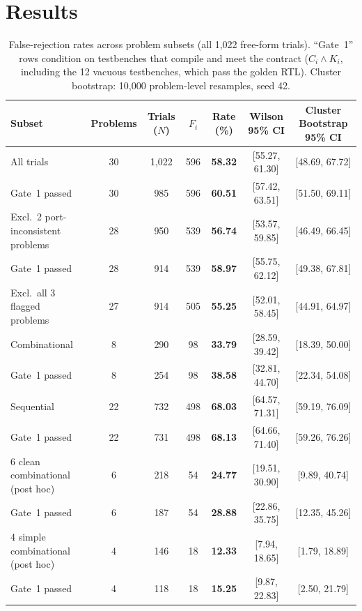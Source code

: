 \documentclass[conference]{IEEEtran}
\begin{document}
\section{Results}

\begin{table}[t]
\centering
\caption{False-rejection rates across problem subsets (all 1,022 free-form trials). ``Gate~1'' rows condition on testbenches that compile and meet the contract ($C_i \land K_i$, including the 12 vacuous testbenches, which pass the golden RTL). Cluster bootstrap: 10,000 problem-level resamples, seed 42.}
\label{tab:headline_rates}
\footnotesize
\setlength{\tabcolsep}{4pt}
\begin{tabular}{lcccccc}
\toprule
\textbf{Subset} & \textbf{Problems} & \textbf{Trials ($N$)} & \textbf{$F_i$} & \textbf{Rate (\%)} & \textbf{Wilson 95\% CI} & \textbf{Cluster Bootstrap 95\% CI} \\
\midrule
All trials & 30 & 1,022 & 596 & \textbf{58.32} & [55.27, 61.30] & [48.69, 67.72] \\
Gate~1 passed & 30 & 985 & 596 & \textbf{60.51} & [57.42, 63.51] & [51.50, 69.11] \\
\midrule
Excl.\ 2 port-inconsistent problems & 28 & 950 & 539 & \textbf{56.74} & [53.57, 59.85] & [46.49, 66.45] \\
\quad Gate~1 passed & 28 & 914 & 539 & \textbf{58.97} & [55.75, 62.12] & [49.38, 67.81] \\
Excl.\ all 3 flagged problems & 27 & 914 & 505 & \textbf{55.25} & [52.01, 58.45] & [44.91, 64.97] \\
\midrule
Combinational & 8 & 290 & 98 & \textbf{33.79} & [28.59, 39.42] & [18.39, 50.00] \\
\quad Gate~1 passed & 8 & 254 & 98 & \textbf{38.58} & [32.81, 44.70] & [22.34, 54.08] \\
Sequential & 22 & 732 & 498 & \textbf{68.03} & [64.57, 71.31] & [59.19, 76.09] \\
\quad Gate~1 passed & 22 & 731 & 498 & \textbf{68.13} & [64.66, 71.40] & [59.26, 76.26] \\
\midrule
6 clean combinational (post hoc) & 6 & 218 & 54 & \textbf{24.77} & [19.51, 30.90] & [9.89, 40.74] \\
\quad Gate~1 passed & 6 & 187 & 54 & \textbf{28.88} & [22.86, 35.75] & [12.35, 45.26] \\
4 simple combinational (post hoc) & 4 & 146 & 18 & \textbf{12.33} & [7.94, 18.65] & [1.79, 18.89] \\
\quad Gate~1 passed & 4 & 118 & 18 & \textbf{15.25} & [9.87, 22.83] & [2.50, 21.79] \\
\bottomrule
\end{tabular}
\end{table}
\end{document}
